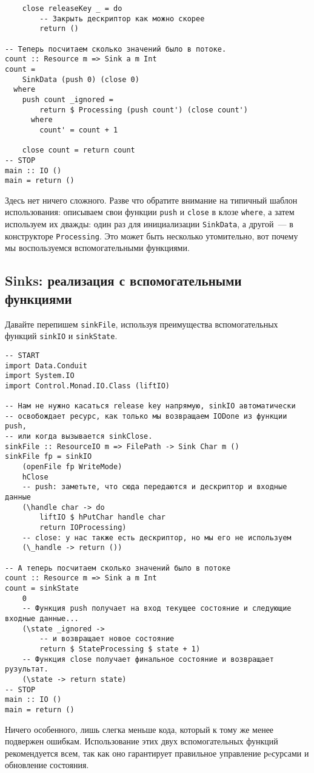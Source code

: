 {\begin{lstlisting}
    close releaseKey _ = do
        -- Закрыть дескриптор как можно скорее
        return ()

-- Теперь посчитаем сколько значений было в потоке.
count :: Resource m => Sink a m Int
count =
    SinkData (push 0) (close 0)
  where
    push count _ignored =
        return $ Processing (push count') (close count')
      where
        count' = count + 1

    close count = return count
-- STOP
main :: IO ()
main = return ()
\end{lstlisting}
Здесь нет ничего сложного. Разве что обратите внимание на типичный шаблон использования:
описываем свои функции \lstinline'push' и \lstinline'close' в клозе \lstinline'where', а
затем используем их дважды:
один раз для инициализации \lstinline'SinkData', а другой~--- в конструкторе
\lstinline'Processing'. 
Это может быть несколько утомительно, вот почему мы воспользуемся вспомогательными функциями.

\subsection{Sinks: реализация с вспомогательными функциями}
Давайте перепишем \lstinline'sinkFile', используя преимущества вспомогательных функций 
\lstinline'sinkIO' и \lstinline'sinkState'.
\begin{lstlisting}
-- START
import Data.Conduit
import System.IO
import Control.Monad.IO.Class (liftIO)

-- Нам не нужно касаться release key напрямую, sinkIO автоматически
-- освобождает ресурс, как только мы возвращаем IODone из функции push,
-- или когда вызывается sinkClose.
sinkFile :: ResourceIO m => FilePath -> Sink Char m ()
sinkFile fp = sinkIO
    (openFile fp WriteMode)
    hClose
    -- push: заметьте, что сюда передаются и дескриптор и входные данные
    (\handle char -> do
        liftIO $ hPutChar handle char
        return IOProcessing)
    -- close: у нас также есть дескриптор, но мы его не используем
    (\_handle -> return ())

-- А теперь посчитаем сколько значений было в потоке
count :: Resource m => Sink a m Int
count = sinkState
    0
    -- Функция push получает на вход текущее состояние и следующие входные данные...
    (\state _ignored ->
        -- и возвращает новое состояние
        return $ StateProcessing $ state + 1)
    -- Функция close получает финальное состояние и возвращает рузультат.
    (\state -> return state)
-- STOP
main :: IO ()
main = return ()
\end{lstlisting}
Ничего особенного, лишь слегка меньше кода, который к тому же менее подвержен ошибкам. Использование этих двух
вспомогательных  функций рекомендуется всем, так как оно гарантирует правильное
управление рeсурсами и обновление состояния.

}
